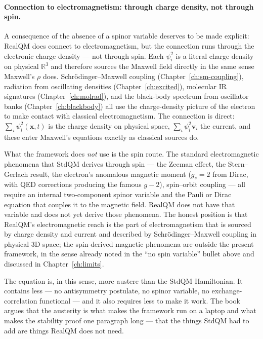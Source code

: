 \paragraph{Connection to electromagnetism: through charge density, not through spin.}
A consequence of the absence of a spinor variable deserves to be made explicit: RealQM does connect to electromagnetism, but the connection runs through the electronic charge density --- not through spin. Each $\psi_i^2$ is a literal charge density on physical $\mathbb{R}^3$ and therefore sources the Maxwell field directly in the same sense Maxwell's $\rho$ does. Schr\"odinger--Maxwell coupling (Chapter~\ref{ch:sm-coupling}), radiation from oscillating densities (Chapter~\ref{ch:excited}), molecular IR signatures (Chapter~\ref{ch:molrad}), and the black-body spectrum from oscillator banks (Chapter~\ref{ch:blackbody}) all use the charge-density picture of the electron to make contact with classical electromagnetism. The connection is direct: $\sum_i \psi_i^2(\mathbf{x}, t)$ is the charge density on physical space, $\sum_i \psi_i^2 \mathbf{v}_i$ the current, and these enter Maxwell's equations exactly as classical sources do.

What the framework does \emph{not} use is the spin route. The standard electromagnetic phenomena that StdQM derives through spin --- the Zeeman effect, the Stern--Gerlach result, the electron's anomalous magnetic moment ($g_s = 2$ from Dirac, with QED corrections producing the famous $g{-}2$), spin--orbit coupling --- all require an internal two-component spinor variable and the Pauli or Dirac equation that couples it to the magnetic field. RealQM does not have that variable and does not yet derive those phenomena. The honest position is that RealQM's electromagnetic reach is the part of electromagnetism that is sourced by charge density and current and described by Schr\"odinger--Maxwell coupling in physical 3D space; the spin-derived magnetic phenomena are outside the present framework, in the sense already noted in the ``no spin variable'' bullet above and discussed in Chapter~\ref{ch:limits}.

The equation is, in this sense, more austere than the StdQM Hamiltonian. It contains less --- no antisymmetry postulate, no spinor variable, no exchange-correlation functional --- and it also requires less to make it work. The book argues that the austerity is what makes the framework run on a laptop and what makes the stability proof one paragraph long --- that the things StdQM had to add are things RealQM does not need.

